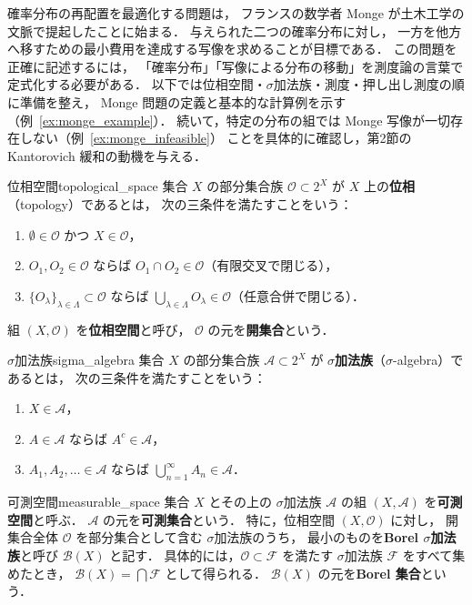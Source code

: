\documentclass[uplatex, dvipdfmx]{jsarticle}
\begin{document}
確率分布の再配置を最適化する問題は，
フランスの数学者 Monge が土木工学の文脈で提起したことに始まる．
与えられた二つの確率分布に対し，
一方を他方へ移すための最小費用を達成する写像を求めることが目標である．
この問題を正確に記述するには，
「確率分布」「写像による分布の移動」を測度論の言葉で定式化する必要がある．
以下では位相空間・$\sigma$加法族・測度・押し出し測度の順に準備を整え，
Monge 問題の定義と基本的な計算例を示す（例~\ref{ex:monge_example}）．
続いて，特定の分布の組では Monge 写像が一切存在しない（例~\ref{ex:monge_infeasible}）
ことを具体的に確認し，第2節の Kantorovich 緩和の動機を与える．

\begin{definition}{位相空間}{topological_space}
集合 $X$ の部分集合族 $\mathcal{O}\subset 2^X$ が
$X$ 上の\textbf{位相}（topology）であるとは，
次の三条件を満たすことをいう：
\begin{enumerate}
  \item $\emptyset\in\mathcal{O}$ かつ $X\in\mathcal{O}$，
  \item $O_1,O_2\in\mathcal{O}$ ならば $O_1\cap O_2\in\mathcal{O}$（有限交叉で閉じる），
  \item $\{O_\lambda\}_{\lambda\in\Lambda}\subset\mathcal{O}$ ならば
        $\bigcup_{\lambda\in\Lambda}O_\lambda\in\mathcal{O}$（任意合併で閉じる）．
\end{enumerate}
組 $(X,\mathcal{O})$ を\textbf{位相空間}と呼び，
$\mathcal{O}$ の元を\textbf{開集合}という．
\end{definition}

\begin{definition}{$\sigma$加法族}{sigma_algebra}
集合 $X$ の部分集合族 $\mathcal{A}\subset 2^X$ が
\textbf{$\sigma$加法族}（$\sigma$-algebra）であるとは，
次の三条件を満たすことをいう：
\begin{enumerate}
  \item $X\in\mathcal{A}$，
  \item $A\in\mathcal{A}$ ならば $A^c\in\mathcal{A}$，
  \item $A_1,A_2,\ldots\in\mathcal{A}$ ならば
        $\bigcup_{n=1}^{\infty}A_n\in\mathcal{A}$．
\end{enumerate}
\end{definition}

\begin{definition}{可測空間}{measurable_space}
集合 $X$ とその上の $\sigma$加法族 $\mathcal{A}$ の組
$(X,\mathcal{A})$ を\textbf{可測空間}と呼ぶ．
$\mathcal{A}$ の元を\textbf{可測集合}という．
特に，位相空間 $(X,\mathcal{O})$ に対し，
開集合全体 $\mathcal{O}$ を部分集合として含む $\sigma$加法族のうち，
最小のものを\textbf{Borel $\sigma$加法族}と呼び $\mathcal{B}(X)$ と記す．
具体的には，$\mathcal{O}\subset\mathcal{F}$ を満たす
$\sigma$加法族 $\mathcal{F}$ をすべて集めたとき，
$\mathcal{B}(X)=\bigcap\mathcal{F}$ として得られる．
$\mathcal{B}(X)$ の元を\textbf{Borel 集合}という．
\end{definition}
\end{document}
